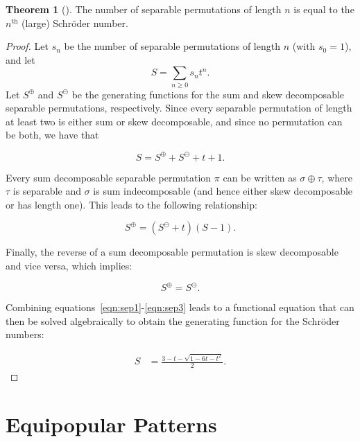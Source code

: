 \documentclass[10pt]{article}
\theoremstyle{definition}
\newtheorem{theorem}{Theorem}[section]
\numberwithin{equation}{section}
\numberwithin{figure}{section}
\begin{document}
\begin{theorem}[\cite{shapiro:bootstrap-perco, west:generating-tree:95}]
The number of separable permutations of length $n$ is equal to the $n^{\text{th}}$ (large) Schr\"oder number. 
\end{theorem}

\begin{proof}
Let $s_n$ be the number of separable permutations of length $n$ (with $s_0 = 1$), and let $$ S = \sum_{n \geq 0} s_n t^n. $$ Let $S^\oplus$ and $S^\ominus$ be the generating functions for the sum and skew decomposable separable permutations, respectively. Since every separable permutation of length at least two is either sum or skew decomposable, and since no permutation can be both, we have that 

\begin{equation} \label{eqn:sep1}
      S = S^\oplus + S^\ominus + t + 1.
\end{equation}

Every sum decomposable separable permutation $\pi$ can be written as $\sigma \oplus \tau$, where $\tau$ is separable and $\sigma$ is sum indecomposable (and hence either skew decomposable or has length one).  This leads to the following relationship:

    \begin{equation} \label{eqn:sep2}
      S^\oplus = (S^\ominus + t) (S-1). 
    \end{equation}

    Finally, the reverse of a sum decomposable permutation is skew decomposable and vice versa, which implies:

    \begin{equation} \label{eqn:sep3}
      S^\oplus = S^\ominus.
    \end{equation}

    Combining equations~\ref{eqn:sep1}-\ref{eqn:sep3} leads to a functional equation that can then be solved algebraically to obtain the generating function for the Schr\"oder numbers:

    $$ \begin{aligned}
      S &= \frac{ 3 - t - \sqrt{1 - 6t - t^2}}{2}. 
      \end{aligned} $$
  \end{proof}





\section{Equipopular Patterns}
\label{sec:equi}
\end{document}
